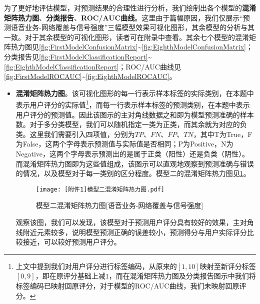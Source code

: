 \documentclass{MathorCupmodeling}
\begin{document}
	为了更好地评估模型，对预测结果的合理性进行分析，我们绘制出各个模型的\textbf{混淆矩阵热力图}、\textbf{分类报告}、\textbf{ROC/AUC曲线}。这里由于篇幅原因，我们仅展示“预测语音业务-网络覆盖与信号强度”三幅模型效果可视化图形，其余模型的分析与其一致。对于其余模型的可视化图形，读者可在附录中查看。其余七个模型的混淆矩阵热力图见\textcolor{blue}{\cref{fig:FirstModelConfusionMatrix}}\textasciitilde\textcolor{blue}{\cref{fig:EighthModelConfusionMatrix}}；分类报告见\textcolor{blue}{\cref{fig:FirstModelClassificationReport}}\textasciitilde\textcolor{blue}{\cref{fig:EighthModelClassificationReport}}；ROC/AUC曲线见\textcolor{blue}{\cref{fig:FirstModelROCAUC}}\textasciitilde\textcolor{blue}{\cref{fig:EighthModelROCAUC}}。
	\begin{itemize}
		\item \textbf{混淆矩阵热力图}。该可视化图形的每一行表示样本标签的实际类别，在本题中表示用户评分的实际值\textcolor{blue}{\footnote{上文中提到我们对用户评分进行标签编码，从原来的$\left[1,10\right]$映射至新评分标签$\left[0,9\right]$，即在原评分基础上减$1$，而在混淆矩阵热力图及分类报告图示中我们将标签编码已映射回原评分，对于模型的ROC/AUC曲线，我们未映射回原评分。}}，而每一行表示样本标签的预测类别，在本题中表示用户评分的预测值。因此该图示的主对角线数据之和即为模型预测准确的样本数。对于多分类模型，我们可以随机指定一类为正类，而其余就为对应的负类。这里我们需要引入四项值，分别为$TP$、$FN$、$FP$、$TN$，其中T为True，F为False，这两个字母表示预测值与实际值是否相同；P为Positive，N为Negative，这两个字母表示预测出的是属于正类（阳性）还是负类（阴性）。而混淆矩阵热力图即为这些值组成，该图示可以直观地观察到预测准确与错误的情况，以及模型对于每一类别的区分程度。模型二的混淆矩阵热力图见\textcolor{blue}{\cref{fig:SecondModelConfusionMatrix}}。
		\begin{figure}[H]
			\centerline{\texttt{[image: [附件1]模型二混淆矩阵热力图.pdf]}}
			\caption{模型二混淆矩阵热力图[语音业务-网络覆盖与信号强度]}\label{fig:SecondModelConfusionMatrix}
		\end{figure}

		观察该图，我们可以发现，该模型对于预测用户评分具有较好的效果，主对角线附近元素较多，说明模型预测正确的误差较小，预测得分与用户实际评分比较接近，可以较好预测用户评分。


\end{itemize}
\end{document}

